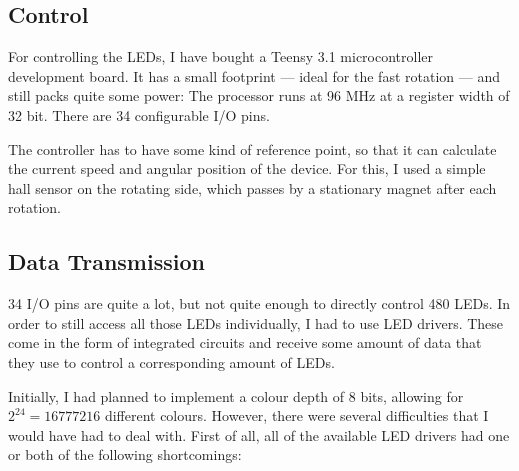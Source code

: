 \documentclass[a4paper, 11pt, titlepage]{report}
\begin{document}
\subsection{Control}

For controlling the LEDs, I have bought a Teensy 3.1 microcontroller development board. It has a
small footprint --- ideal for the fast rotation --- and still packs quite some power: The processor
runs at 96 MHz at a register width of 32 bit. There are 34 configurable I/O pins.

The controller has to have some kind of reference point, so that it can calculate the current speed
and angular position of the device. For this, I used a simple hall sensor on the rotating side, 
which passes by a stationary magnet after each rotation.



\subsection{Data Transmission}

34 I/O pins are quite a lot, but not quite enough to directly control 480 LEDs. In order to still
access all those LEDs individually, I had to use LED drivers. These come in the form of integrated
circuits and receive some amount of data that they use to control a corresponding amount of LEDs.

Initially, I had planned to implement a colour depth of 8 bits, allowing for 
$2^{24} = 16777216$ different colours. However, there were several difficulties that I would have
had to deal with. First of all, all of the available LED drivers had one or both of the following
shortcomings:
\end{document}
